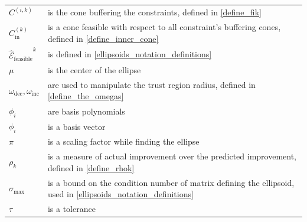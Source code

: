 \documentclass{article}
\theoremstyle{case}
\numberwithin{theorem}{subsection}
\newcommand{\fcki}{{C^{(k)}_{\textrm{in}}}}
\newcommand{\omegadec}{\omega_{\text{dec}}}
\newcommand{\omegainc}{\omega_{\text{inc}}}
\newcommand{\rk}{\rho_k}
\newcommand{\scaledunshiftedellipsoid}{{{\mathcal {\hat E}_{\text{feasible}}}^k}}
\newcommand{\sigmamax}{{\sigma_{\textrm{max}}}}
\newcommand{\fik}{{C^{(i, k)}}}
\begin{document}
\begin{longtable}{| p{} | p{} |}
$\fik $ & is the cone buffering the constraints, defined in \cref{define_fik} \\ %
$\fcki $ & is a cone feasible with respect to all constraint's buffering cones, defined in \cref{define_inner_cone} \\ %
$\scaledunshiftedellipsoid$ & is defined in \cref{ellipsoids_notation_definitions} \\ %
$\mu$ & is the center of the ellipse \\ %
$\omegadec, \omegainc$ & are used to manipulate the trust region radius, defined in \cref{define_the_omegas} \\ %
$\phi_i$ & are basis polynomials \\ %
$\phi_i$ & is a basis vector \\ %
$\pi$ & is a scaling factor while finding the ellipse \\ %
$\rk$ & is a measure of actual improvement over the predicted improvement, defined in \cref{define_rhok} \\ %
$\sigmamax$ & is a bound on the condition number of matrix defining the ellipsoid, used in \cref{ellipsoids_notation_definitions} \\ %
$\tau$ & is a tolerance \\ %

\end{longtable}
\end{document}

